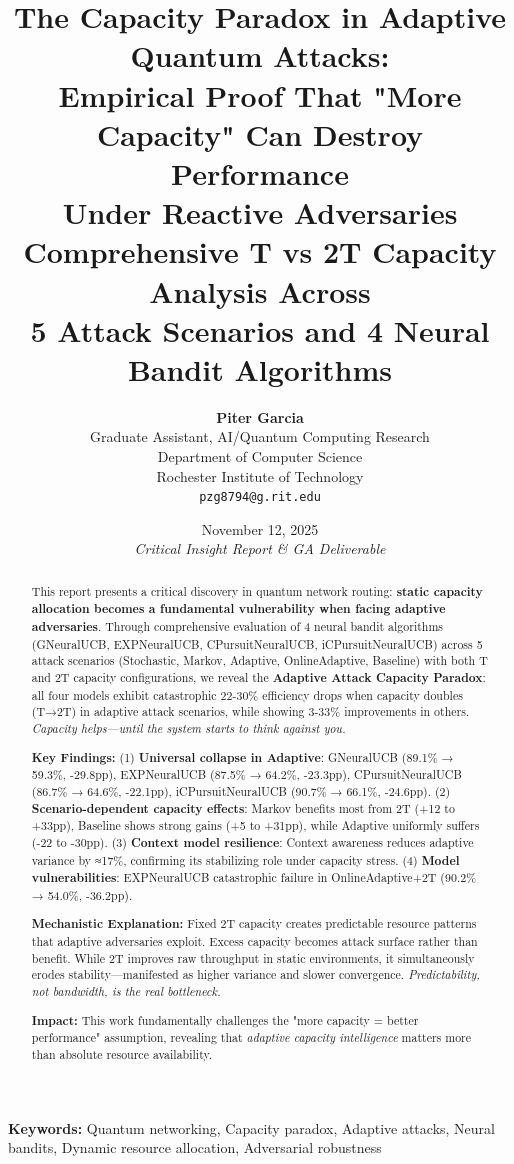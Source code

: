 \documentclass[11pt,a4paper]{article}
\title{
  \vspace{-1.5cm}
  \textbf{\LARGE The Capacity Paradox in Adaptive Quantum Attacks:} \\
  \vspace{0.3cm}
  \textbf{\Large Empirical Proof That "More Capacity" Can Destroy Performance} \\
  \textbf{\Large Under Reactive Adversaries} \\
  \vspace{0.6cm}
  \large Comprehensive T vs 2T Capacity Analysis Across \\
  5 Attack Scenarios and 4 Neural Bandit Algorithms
}
\author{
  \textbf{Piter Garcia} \\
  Graduate Assistant, AI/Quantum Computing Research \\
  Department of Computer Science \\
  Rochester Institute of Technology \\
  \texttt{pzg8794@g.rit.edu}
}
\date{
  November 12, 2025 \\
  \vspace{0.3cm}
  \textit{Critical Insight Report \& GA Deliverable}
}
\newcommand{\critical}[1]{\textcolor{criticalcolor}{\textbf{#1}}}
\begin{document}
\maketitle

\begin{abstract}
This report presents a critical discovery in quantum network routing: \textbf{static capacity allocation becomes a fundamental vulnerability when facing adaptive adversaries}. Through comprehensive evaluation of 4 neural bandit algorithms (GNeuralUCB, EXPNeuralUCB, CPursuitNeuralUCB, iCPursuitNeuralUCB) across 5 attack scenarios (Stochastic, Markov, Adaptive, OnlineAdaptive, Baseline) with both T and 2T capacity configurations, we reveal the \critical{Adaptive Attack Capacity Paradox}: all four models exhibit catastrophic 22-30\% efficiency drops when capacity doubles (T→2T) in adaptive attack scenarios, while showing 3-33\% improvements in others. \textit{Capacity helps—until the system starts to think against you.}

\textbf{Key Findings:} (1) \textbf{Universal collapse in Adaptive}: GNeuralUCB (89.1\% → 59.3\%, -29.8pp), EXPNeuralUCB (87.5\% → 64.2\%, -23.3pp), CPursuitNeuralUCB (86.7\% → 64.6\%, -22.1pp), iCPursuitNeuralUCB (90.7\% → 66.1\%, -24.6pp). (2) \textbf{Scenario-dependent capacity effects}: Markov benefits most from 2T (+12 to +33pp), Baseline shows strong gains (+5 to +31pp), while Adaptive uniformly suffers (-22 to -30pp). (3) \textbf{Context model resilience}: Context awareness reduces adaptive variance by ≈17\%, confirming its stabilizing role under capacity stress. (4) \textbf{Model vulnerabilities}: EXPNeuralUCB catastrophic failure in OnlineAdaptive+2T (90.2\% → 54.0\%, -36.2pp).

\textbf{Mechanistic Explanation:} Fixed 2T capacity creates predictable resource patterns that adaptive adversaries exploit. Excess capacity becomes attack surface rather than benefit. While 2T improves raw throughput in static environments, it simultaneously erodes stability—manifested as higher variance and slower convergence. \textit{Predictability, not bandwidth, is the real bottleneck.}

\textbf{Impact:} This work fundamentally challenges the "more capacity = better performance" assumption, revealing that \textit{adaptive capacity intelligence} matters more than absolute resource availability.
\end{abstract}

\vspace{0.3cm}
\noindent\textbf{Keywords:} Quantum networking, Capacity paradox, Adaptive attacks, Neural bandits, Dynamic resource allocation, Adversarial robustness
\end{document}
